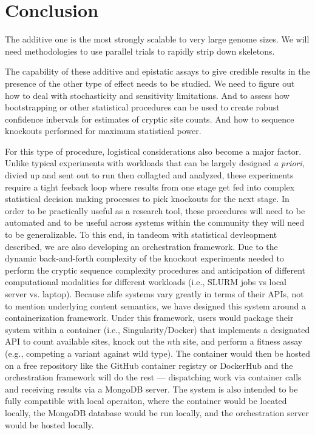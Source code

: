 \section{Conclusion} \label{sec:conclusion}

The additive one is the most strongly scalable to very large genome sizes.
We will need methodologies to use parallel trials to rapidly strip down skeletons.

The capability of these additive and epistatic assays to give credible results in the presence of the other type of effect needs to be studied.
We need to figure out how to deal with stochasticity and sensitivity limitations.
And to assess how bootstrapping or other statistical procedures can be used to create robust confidence inbervals for estimates of cryptic site counts.
And how to sequence knockouts performed for maximum statistical power.


For this type of procedure, logistical considerations also become a major factor.
Unlike typical experiments with workloads that can be largely designed \textit{a priori}, divied up and sent out to run then collagted and analyzed, these experiments require a tight feeback loop where results from one stage get fed into complex statistical decision making processes to pick knockouts for the next stage.
In order to be practically useful as a research tool, these procedures will need to be automated and to be useful across systems within the community they will need to be generalizable.
To this end, in tandeom with statistical devleopment described, we are also developing an orchestration framework.
Due to the dynamic back-and-forth complexity of the knockout experiments needed to perform the cryptic sequence complexity procedures  and anticipation of different computational modalities for different workloads (i.e., SLURM jobs vs local server vs. laptop).
Because alife systems vary greatly in terms of their APIs, not to mention underlying content semantics, we have designed this system around a containerization framework.
Under this framework, users would package their system within a container (i.e., Singularity/Docker) that implements a designated API to count available sites, knock out the $n$th site, and perform a fitness assay (e.g., competing a variant against wild type).
The container would then be hosted on a free repository like the GitHub container registry or DockerHub and the orchestration framework will do the rest --- dispatching work via container calls and receiving results via a MongoDB server.
The system is also intended to be fully compatible with local operaiton, where the container would be located locally, the MongoDB database would be run locally, and the orchestration server would be hosted locally.

